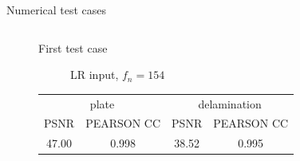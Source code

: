 \documentclass[10pt,aspectratio=169,dvipsnames]{beamer} %
\begin{document}
\begin{frame}{Numerical test cases}
\begin{columns}[T]
\begin{column}[c]{0.5\textwidth}
\begin{figure}
{\begin{alertblock}{First test case}
\begin{figure}
							\caption{LR input, $f_n=154$}
						\end{figure}							
						\begin{table}[!h]
							\centering 
							\footnotesize
							\begin{tabular}{cccc}
								\toprule
								\multicolumn{2}{c}{plate} & \multicolumn{2}{c}{delamination} \\
								\cmidrule(lr){1-2} \cmidrule(lr){3-4}
								PSNR & PEARSON CC & PSNR & PEARSON CC \\ 
								\midrule
								47.00 & 0.998 & 38.52 & 0.995 \\					
								\bottomrule
							\end{tabular}
							\label{tab:num_DLSR_results_2_}
						\end{table}	
				\end{alertblock}}
\end{figure}
\end{column}
\end{columns}
\end{frame}
\end{document}
